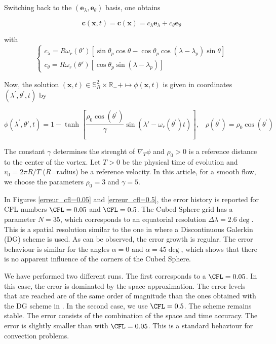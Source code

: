 Switching back to the $(\mathbf{e}_\lambda,\mathbf{e}_\theta)$ basis, one obtains

\begin{equation}
\mathbf{c}(\mathbf{x},t)=\mathbf{c}(\mathbf{x})=c_{\lambda} \mathbf{e}_{\lambda}+
c_{\theta} \mathbf{e}_{\theta}
\end{equation}

with
\begin{equation}
\left\{
\begin{array}{l}
c_{\lambda} = R \omega_r ( \theta' ) \left[ \sin \theta_p \cos \theta - \cos \theta_p \cos ( \lambda - \lambda_p ) \sin \theta \right]\\
c_{\theta} = R \omega_r ( \theta' ) 
\left[ \cos \theta_p \sin ( \lambda - \lambda_p ) \right]
\label{eq:78.10}
\end{array}
\right.
\end{equation}

Now, the solution $(\mathbf{x}, t) \in \mathbb{S}_R^2 \times \mathbb{R}_{-}+ \mapsto
\phi(\mathbf{x},t)$ is given in coordinates $(\lambda^\prime,\theta^\prime,t)$ by

\begin{equation}
\phi ( \lambda^\prime , \theta', t ) 
= 
1 - \tanh \left[ \dfrac{\rho_0\cos(\theta^\prime)}{\gamma} \sin ( \lambda' 
- \omega_r(\theta^\prime) t ) \right],\;\;\; \rho(\theta^\prime)= 
\rho_0 \cos(\theta^\prime)
\label{NM_exacte}
\end{equation}

The constant $\gamma$ determines the strenght of $\nabla_T\phi$ and $\rho_0>0$ is a reference distance to the center of the vortex.
Let $T>0$ be the physical time of evolution and $v_0 = 2 \pi R / T$ ($R$=radius) be a reference velocity. 
In this article, for a smooth flow, we choose the parameters $\rho_0 = 3$ and $ \gamma = 5$.

In Figures \ref{erreur_cfl=0.05} and \ref{erreur_cfl=0.5}, the error history is reported for CFL numbers $\CFL=0.05$ and $\CFL=0.5$.
The Cubed Sphere grid has a parameter $N=35$, which corresponds to an equatorial resolution $\Delta \lambda = 2.6 \deg$. 
This is a spatial resolution similar to the one in \cite{Nair-Jablonowski} where a Discontinuous Galerkin (DG) scheme is used.
As can be observed, the error growth is regular.
The error behaviour is similar for the angles $\alpha=0$ and $\alpha=45\deg$, which shows that there is no apparent influence of the corners of the Cubed Sphere.

We have performed two different runs. The first corresponds to a $\CFL=0.05$. In this case, the error is dominated by the space approximation.
The error levels that are reached are of the same order of magnitude than the ones obtained with the DG scheme in \cite{Nair-Jablonowski}.
In the second case, we use $\CFL=0.5$.  The scheme remains stable.
The error consists of the combination of the space and time accuracy.
The error is slightly smaller than with $\CFL=0.05$. This is a standard behaviour for convection problems.

